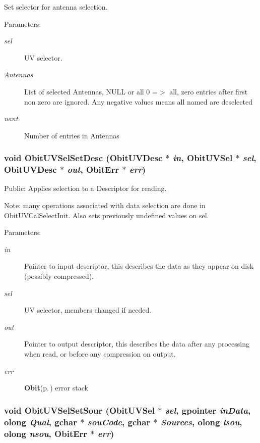 Set selector for antenna selection. 

\begin{Desc}
\item[Parameters:]
\begin{description}
\item[{\em sel}]UV selector. \item[{\em Antennas}]List of selected Antennas, NULL or all 0 =$>$ all, zero entries after first non zero are ignored. Any negative values means all named are deselected \item[{\em nant}]Number of entries in Antennas \end{description}
\end{Desc}
\subsubsection{\setlength{\rightskip}{0pt plus 5cm}void Obit\-UVSel\-Set\-Desc ({\bf Obit\-UVDesc} $\ast$ {\em in}, {\bf Obit\-UVSel} $\ast$ {\em sel}, {\bf Obit\-UVDesc} $\ast$ {\em out}, {\bf Obit\-Err} $\ast$ {\em err})}\label{ObitUVSel_8h_a10}


Public: Applies selection to a Descriptor for reading. 

Note: many operations associated with data selection are done in Obit\-UVCal\-Select\-Init. Also sets previously undefined values on sel. \begin{Desc}
\item[Parameters:]
\begin{description}
\item[{\em in}]Pointer to input descriptor, this describes the data as they appear on disk (possibly compressed). \item[{\em sel}]UV selector, members changed if needed. \item[{\em out}]Pointer to output descriptor, this describes the data after any processing when read, or before any compression on output. \item[{\em err}]{\bf Obit}{\rm (p.\,\pageref{structObit})} error stack \end{description}
\end{Desc}
\subsubsection{\setlength{\rightskip}{0pt plus 5cm}void Obit\-UVSel\-Set\-Sour ({\bf Obit\-UVSel} $\ast$ {\em sel}, gpointer {\em in\-Data}, {\bf olong} {\em Qual}, gchar $\ast$ {\em sou\-Code}, gchar $\ast$ {\em Sources}, {\bf olong} {\em lsou}, {\bf olong} {\em nsou}, {\bf Obit\-Err} $\ast$ {\em err})}\label{ObitUVSel_8h_a14}


